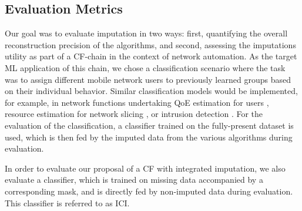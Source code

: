 			\subsection{Evaluation Metrics}
			
				Our goal was to evaluate imputation in two ways: first, quantifying the overall reconstruction precision of the algorithms, and second, assessing the imputations utility as part of a \ac{CF}-chain in the context of network automation.
				As the target \ac{ML} application of this chain, we chose a classification scenario where the task was to assign different mobile network users to previously learned groups based on their individual behavior.
				Similar classification models would be implemented, for example, in network functions undertaking \ac{QoE} estimation for users \cite{qoe_est}, resource estimation for network slicing \cite{netw_slice}, or intrusion detection \cite{intrusion_det}.
				For the evaluation of the classification, a classifier trained on the fully-present dataset is used, which is then fed by the imputed data from the various algorithms during evaluation.
				
				In order to evaluate our proposal of a \ac{CF} with integrated imputation, we also evaluate a classifier, which is trained on missing data accompanied by a corresponding mask, and is directly fed by non-imputed data during evaluation.
				This classifier is referred to as \ac{ICI}.
				
